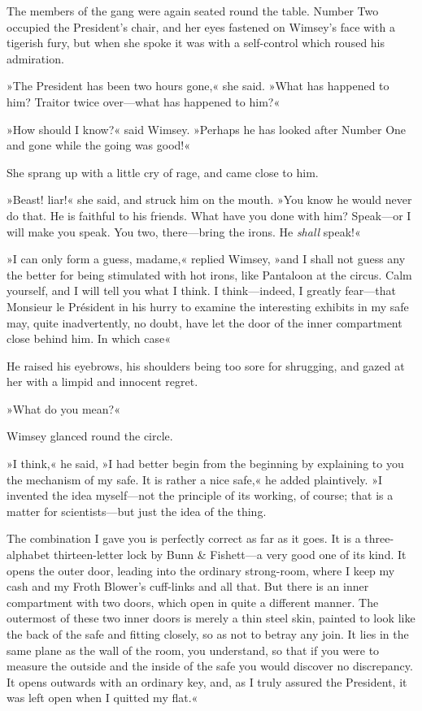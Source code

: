 The members of the gang were again seated round the table. Number Two occupied the President's chair, and her eyes fastened on Wimsey's face with a tigerish fury, but when she spoke it was with a self-control which roused his admiration.

»The President has been two hours gone,« she said. »What has happened to him? Traitor twice over—what has happened to him?«

»How should I know?« said Wimsey. »Perhaps he has looked after Number One and gone while the going was good!«

She sprang up with a little cry of rage, and came close to him.

»Beast! liar!« she said, and struck him on the mouth. »You know he would never do that. He is faithful to his friends. What have you done with him? Speak—or I will make you speak. You two, there—bring the irons. He \textit{shall} speak!«

»I can only form a guess, madame,« replied Wimsey, »and I shall not guess any the better for being stimulated with hot irons, like Pantaloon at the circus. Calm yourself, and I will tell you what I think. I think—indeed, I greatly fear—that Monsieur le Président in his hurry to examine the interesting exhibits in my safe may, quite inadvertently, no doubt, have let the door of the inner compartment close behind him. In which case\longdash«

He raised his eyebrows, his shoulders being too sore for shrugging, and gazed at her with a limpid and innocent regret.

»What do you mean?«

Wimsey glanced round the circle.

»I think,« he said, »I had better begin from the beginning by explaining to you the mechanism of my safe. It is rather a nice safe,« he added plaintively. »I invented the idea myself—not the principle of its working, of course; that is a matter for scientists—but just the idea of the thing.

The combination I gave you is perfectly correct as far as it goes. It is a three-alphabet thirteen-letter lock by Bunn \& Fishett—a very good one of its kind. It opens the outer door, leading into the ordinary strong-room, where I keep my cash and my Froth Blower's cuff-links and all that. But there is an inner compartment with two doors, which open in quite a different manner. The outermost of these two inner doors is merely a thin steel skin, painted to look like the back of the safe and fitting closely, so as not to betray any join. It lies in the same plane as the wall of the room, you understand, so that if you were to measure the outside and the inside of the safe you would discover no discrepancy. It opens outwards with an ordinary key, and, as I truly assured the President, it was left open when I quitted my flat.«

